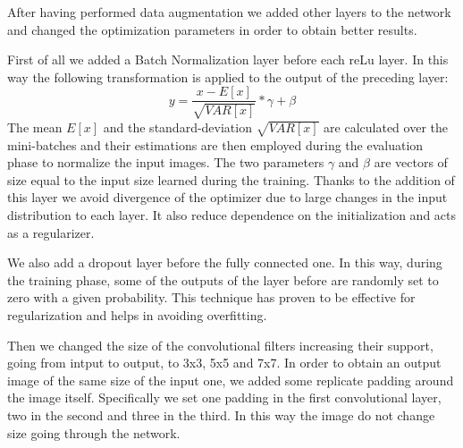 \documentclass[12pt, a4paper]{report}
\begin{document}
After having performed data augmentation we added other layers to the network and changed the optimization parameters in order to obtain better results.

First of all we added a Batch Normalization layer before each reLu layer. In this way the following transformation is applied to the output of the preceding layer:
$$ y = \frac{x - E[x]}{\sqrt{VAR[x]}} * \gamma + \beta$$
The mean $E[x]$ and the standard-deviation $\sqrt{VAR[x]}$ are calculated over the mini-batches and their estimations are then employed during the evaluation phase to normalize the input images. The two parameters $\gamma$ and $\beta$ are vectors of size equal to the input size learned during the training. Thanks to the addition of this layer we avoid divergence of the optimizer due to large changes in the input distribution to each layer. It also reduce dependence on the initialization and acts as a regularizer.

We also add a dropout layer before the fully connected one. In this way, during the training phase, some of the outputs of the layer before are randomly set to zero with a given probability. This technique has proven to be effective for regularization and helps in avoiding overfitting.

Then we changed the size of the convolutional filters increasing their support, going from intput to output, to 3x3, 5x5 and 7x7. In order to obtain an output image of the same size of the input one, we added some replicate padding around the image itself. Specifically we set one padding in the first convolutional layer, two in the second and three in the third. In this way the image do not change size going through the network.
\end{document}
